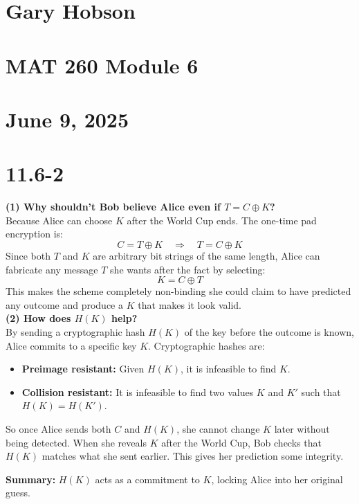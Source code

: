 \documentclass[12pt]{article}
\begin{document}
\section*{Gary Hobson}
\section*{MAT 260 Module 6}
\section*{June 9, 2025} 
\newpage
\section{11.6-2}
\textbf{(1) Why shouldn't Bob believe Alice even if \( T = C \oplus K \)?} \\
Because Alice can choose \( K \) after the World Cup ends. The one-time pad encryption is:
\[
C = T \oplus K \quad \Rightarrow \quad T = C \oplus K
\]
Since both \( T \) and \( K \) are arbitrary bit strings of the same length, Alice can fabricate any message \( T \) she wants after the fact by selecting:
\[
K = C \oplus T
\]
This makes the scheme completely non-binding she could claim to have predicted any outcome and produce a \( K \) that makes it look valid.\\

\textbf{(2) How does \( H(K) \) help?} \\
By sending a cryptographic hash \( H(K) \) of the key before the outcome is known, Alice commits to a specific key \( K \). Cryptographic hashes are:
\begin{itemize}
    \item \textbf{Preimage resistant:} Given \( H(K) \), it is infeasible to find \( K \).
    \item \textbf{Collision resistant:} It is infeasible to find two values \( K \) and \( K' \) such that \( H(K) = H(K') \).
\end{itemize}
So once Alice sends both \( C \) and \( H(K) \), she cannot change \( K \) later without being detected. When she reveals \( K \) after the World Cup, Bob checks that \( H(K) \) matches what she sent earlier. This gives her prediction some integrity.

\textbf{Summary:} \( H(K) \) acts as a commitment to \( K \), locking Alice into her original guess.\\
\end{document}
